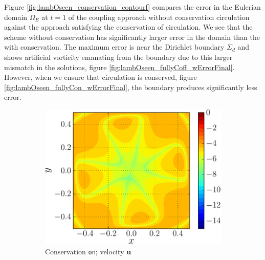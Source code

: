 Figure \ref{fig:lambOseen_conservation_contourf} compares the error in the Eulerian domain $\Omega_E$ at $t=1$ of the coupling approach without conservation circulation against the approach satisfying the conservation of circulation. We see that the scheme without conservation has significantly larger error in the domain than the with conservation. The maximum error is near the Dirichlet boundary $\Sigma_d$ and shows artificial vorticity emanating from the boundary due to this larger mismatch in the solutions, figure \ref{fig:lambOseen_fullyCoff_wErrorFinal}. However, when we ensure that circulation is conserved, figure \ref{fig:lambOseen_fullyCon_wErrorFinal}, the boundary produces significantly less error.

	\begin{figure}[!p]
     \centering
     \begin{subfigure}[t]{0.45\textwidth}
             \includegraphics[width=\linewidth]{./figures/hybrid/lambOseent2/lambOseen_fully_vErrorFinal_compressed-crop.pdf}
             \caption{Conservation \texttt{on}; velocity $\mathbf{u}$}
             \label{fig:lambOseen_fullyCon_vErrorFinal}
     \end{subfigure}%
     \qquad %
    \begin{subfigure}[t]{0.45\textwidth}

\end{subfigure}
\end{figure}

